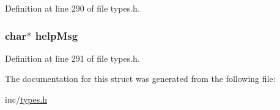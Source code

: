 Definition at line 290 of file types.h.

\hypertarget{structcommand_t_aecae62b0d3cecad6022e749f64cc8a8e}{
\subsubsection[{helpMsg}]{\setlength{\rightskip}{0pt plus 5cm}char$\ast$ {\bf helpMsg}}}
\label{structcommand_t_aecae62b0d3cecad6022e749f64cc8a8e}


Definition at line 291 of file types.h.



The documentation for this struct was generated from the following file:\begin{DoxyCompactItemize}
\item 
inc/\hyperlink{types_8h}{types.h}\end{DoxyCompactItemize}
